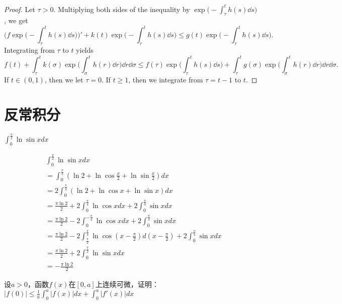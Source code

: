 \begin{proof}
  Let $\tau > 0$. 
  Multiplying both sides of the inequality by $\exp\big(-\int_\tau^th(s)\dd s\big)$, 
  we get 
  \begin{equation*}
    \bigg(f\exp\Big(-\int_\tau^th(s)\dd s\Big)\bigg)'
    + k(t)\exp\bigg(-\int_\tau^th(s)\dd s\bigg) 
    \le g(t)\exp\bigg(-\int_\tau^th(s)\dd s\bigg).
  \end{equation*}
  Integrating from $\tau$ to $t$ yields 
  \begin{equation*}
    f(t) 
    + \int_\tau^t k(\sigma)\exp\bigg(\int_\sigma^th(r)\dd r\bigg)\dd r\dd\sigma
    \leq f(\tau)\exp\bigg(\int_\tau^th(s)\dd s\bigg)
    + \int_\tau^t g(\sigma)\exp\bigg(\int_\sigma^th(r)\dd r\bigg)\dd r\dd\sigma.
  \end{equation*}
  If $t\in(0,1)$, then we let $\tau=0$.
  If $t\geq1$, then we integrate from $\tau=t-1$ to $t$.
\end{proof}
 
\section{反常积分}

  \begin{example}
    $\int_0^{\frac {\pi}2}\ln\sin xdx$
  \end{example}
  
  \begin{solution}
  \begin{align*}
  &\int_0^{\frac{\pi}{2}}\ln\sin xdx\\
  &=\int_0^{\frac{\pi}{2}}(\ln2+\ln\cos\frac{x}{2}+\ln\sin\frac{x}{2})dx\\
  &=2\int_0^{\frac{\pi}{4}}(\ln2+\ln\cos x+\ln\sin x)dx\\
  &=\frac{\pi\ln2}{2}+2\int_0^{\frac{\pi}{4}}\ln\cos xdx+2\int_0^{\frac{\pi}{4}}\sin xdx\\
  &=\frac{\pi\ln2}{2}-2\int_0^{-\frac{\pi}{4}}\ln\cos xdx+2\int_0^{\frac{\pi}{4}}\sin xdx\\
  &=\frac{\pi\ln2}{2}-2\int_{\frac{\pi}{2}}^{\frac{\pi}{4}}\ln\cos(x-\frac{\pi}{2})d(x-\frac{\pi}{2})+2\int_0^{\frac{\pi}{4}}\sin xdx\\
  &=\frac{\pi\ln2}{2}+2\int_0^{\frac{\pi}{2}}\ln\sin xdx\\
  &=-\frac{\pi\ln2}{2}
  \end{align*}
\end{solution}
  
\begin{example}
    设$a>0$，函数$f(x)$在$[0,a]$上连续可微，证明：$|f(0)|\leq\frac1a\int_0^a|f(x)|dx+\int_0^a|f'(x)|dx$
\end{example}    
    
